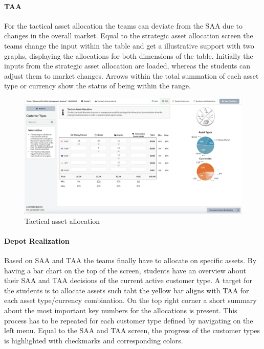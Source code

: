 \paragraph{TAA}
For the tactical asset allocation the teams can deviate from the SAA due to changes in the overall market. Equal to the strategic asset allocation screen the teams change the input within the table and get a illustrative support with two graphs, displaying the allocations for both dimensions of the table. Initially the inputs from the strategic asset allocation are loaded, whereas the students can adjust them to market changes. Arrows within the total summation of each asset type or currency show the status of being within the range.
\begin{figure}[h!]
  \centering
  \includegraphics[scale=0.2]{img/application-overview/teams/04_taa.png}
  \caption{Tactical asset allocation}
\end{figure}

\paragraph{Depot Realization}
Based on SAA and TAA the teams finally have to allocate on specific assets. By having a bar chart on the top of the screen, students have an overview about their SAA and TAA decisions of the current active customer type. A target for the students is to allocate assets such taht the yellow bar aligns with TAA for each asset type/currency combination. On the top right corner a short summary about the most important key numbers for the allocations is present.
This process has to be repeated for each customer type defined by navigating on the left menu. Equal to the SAA and TAA screen, the progress of the customer types is highlighted with checkmarks and corresponding colors.

